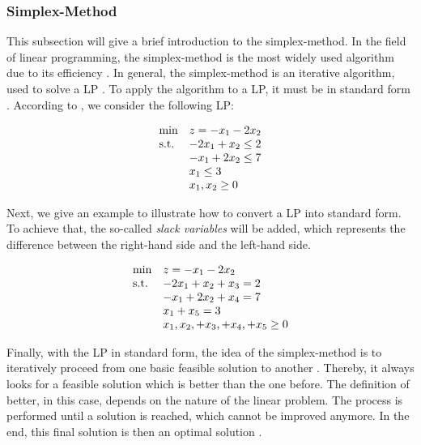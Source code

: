 \subsubsection{Simplex-Method}
This subsection will give a brief introduction to the simplex-method.
In the field of linear programming, the simplex-method 
is the most widely used algorithm due to its  efficiency .
In general, the simplex-method is an iterative algorithm, used to solve 
a LP . To apply the algorithm to a LP, 
it must be in standard form . According to , 
we consider the following LP:

\begin{equation*}
    \begin{array}{ll@{}ll}
        \text{min}  & \displaystyle z = -x_{1} - 2x_{2} &\\
        \text{s.t.}& \displaystyle - 2x_{1} + x_{2} \leq 2 &\\
                    & \displaystyle - x_{1} + 2x_{2} \leq 7 &\\
                    & \displaystyle  x_{1} \leq 3 &\\
                    &                        x_{1}, x_{2} \geq 0
    \end{array}
\end{equation*}

Next, we give an example to illustrate how to convert a LP into standard form.
To achieve that, the so-called \textit{slack variables} will be added, which represents the 
difference between the right-hand side and the left-hand side. 

\begin{equation*}
    \begin{array}{ll@{}ll}
        \text{min}  & \displaystyle z = -x_{1} - 2x_{2} &\\
        \text{s.t.}& \displaystyle - 2x_{1} + x_{2} + x_{3} = 2 &\\
                    & \displaystyle - x_{1} + 2x_{2} + x_{4} = 7 &\\
                    & \displaystyle  x_{1} + x_{5} = 3 &\\
                    &                        x_{1}, x_{2}, + x_{3}, + x_{4}, + x_{5} \geq 0
    \end{array}
\end{equation*}


Finally, with the LP in standard form, the idea of the simplex-method
is to iteratively proceed from one basic feasible solution to another .
Thereby, it always looks for a feasible solution which is better than the one before. 
The definition of better, in this case, depends on the nature of the linear problem. 
The process is performed until a solution is reached, which cannot 
be improved anymore. In the end, this final solution is then an optimal solution . 


\clearpage





